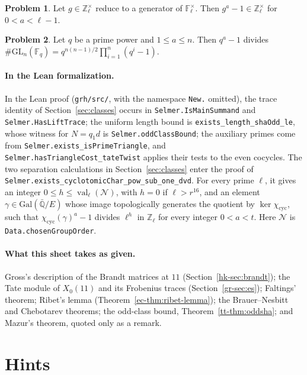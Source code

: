 \documentclass[reqno]{amsart}
\theoremstyle{definition}
\newtheorem{problem}{Problem}[section]
\newcommand{\Z}{\mathbb{Z}}
\newcommand{\Q}{\mathbb{Q}}
\newcommand{\F}{\mathbb{F}}
\newcommand{\GL}{\mathrm{GL}}
\newcommand{\cyc}{\chi_{\mathrm{cyc}}}
\newcommand{\val}{\operatorname{val}}
\begin{document}
\begin{problem}\label{pr:generator}
Let \(g \in \Z_\ell^\times\) reduce to a generator of \(\F_\ell^\times\).  Then \(g^a - 1 \in \Z_\ell^\times\) for \(0 < a < \ell - 1\).
\end{problem}

\begin{problem}\label{pr:gl-order}
Let \(q\) be a prime power and \(1 \le a \le n\).  Then \(q^a - 1\) divides \(\#\GL_n(\F_q) = q^{n(n-1)/2}\prod_{i=1}^n (q^i - 1)\).
\end{problem}


\paragraph{In the Lean formalization.}
In the Lean proof \cite{GL} (\nolinkurl{grh/src/}, with the namespace \texttt{New.} omitted), the trace identity of Section~\ref{sec:classes} occurs in \texttt{Selmer.IsMainSummand} and \texttt{Selmer.HasLiftTrace}; the uniform length bound is \texttt{exists\_length\_shaOdd\_le}, whose witness for \(N=q_1d\) is \texttt{Selmer.oddClassBound}; the auxiliary primes come from \texttt{Selmer.exists\_isPrimeTriangle}, and \texttt{Selmer.hasTriangleCost\_tateTwist} applies their tests to the even cocycles.  The two separation calculations in Section~\ref{sec:classes} enter the proof of \nolinkurl{Selmer.exists_cyclotomicChar_pow_sub_one_dvd}. For every prime \(\ell\), it gives an integer \(0 \le h \le \val_\ell(\mathcal N)\), with \(h = 0\) if \(\ell > r^{16}\), and an element \(\gamma \in \mathrm{Gal}(\bar{\Q}/E)\) whose image topologically generates the quotient by \(\ker\cyc\), such that \(\cyc(\gamma)^a - 1\) divides \(\ell^h\) in \(\Z_\ell\) for every integer \(0 < a < t\).  Here \(\mathcal N\) is \texttt{Data.chosenGroupOrder}.

\paragraph{What this sheet takes as given.}
Gross's description of the Brandt matrices at \(11\) (Section~\ref{hk-sec:brandt}); the Tate module of \(X_0(11)\) and its Frobenius traces (Section~\ref{gr-sec:es}); Faltings' theorem; Ribet's lemma (Theorem~\ref{ec-thm:ribet-lemma}); the Brauer--Nesbitt and Chebotarev theorems; the odd-class bound, Theorem~\ref{tt-thm:oddsha}; and Mazur's theorem, quoted only as a remark.

\section*{Hints}
\end{document}
